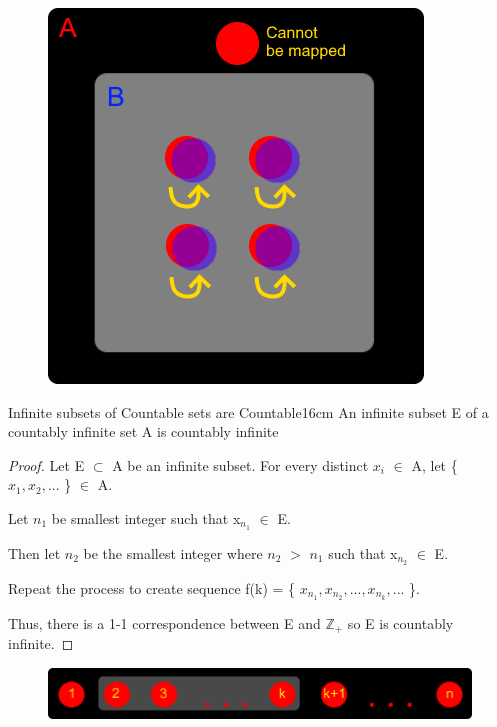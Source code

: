 	\begin{figure}[h]
		\centering
		\includegraphics[scale=0.4]{Images/4.1.4.png}
	\end{figure}

	\newpage



	\begin{wtheorem}{Infinite subsets of Countable sets are Countable}{16cm}
		An infinite subset E of a countably infinite set A is countably infinite
	\end{wtheorem}
	
	\begin{proof}
		Let E $\subset$ A be an infinite subset.
		For every distinct $x_i$ $\in$ A, let \{ $x_1, x_2, ...$ \} $\in$ A.

		Let $n_1$ be smallest integer such that x$_{n_1}$ $\in$ E.

		Then let $n_2$ be the smallest integer where $n_2$ $>$ $n_1$
		such that x$_{n_2}$ $\in$ E.

		Repeat the process to create sequence
		f(k) = \{ $x_{n_1}, x_{n_2}, ... , x_{n_k} , ...$ \}.

		Thus, there is a 1-1 correspondence between E and $\mathbb{Z}_+$ so
		E is countably infinite.
	\end{proof}



	\begin{figure}[h]
		\centering
		\includegraphics[scale=0.5]{Images/4.1.5.png}
	\end{figure}





